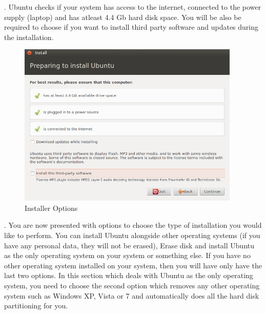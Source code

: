 \par {}. Ubuntu checks if your system has access to the internet, connected to the power supply (laptop) and has atleast 4.4 Gb hard disk space. You will be also be required to choose if you want to install third party software and updates  during the installation. %

\begin{figure}[!h]	
	\begin{center}
	\includegraphics[width=300pt]{./images/installation/installer-prepare.png}
	\caption{Installer Options}	
	\label{fig:installer-prepares}	
	\end{center}
\end{figure}

\par {}. You are now presented with options to choose the type of installation you would like to perform. You can install Ubuntu alongside other operating systems (if you have any personal data, they will not be erased), Erase disk and install Ubuntu as the only operating system on your system or something else. If you have no other operating system installed on your system, then you will have only have the last two options. In this section which deals with Ubuntu as the only operating system, you need to choose the second option which removes any other operating system such as Windows XP, Vista or 7 and automatically does all the hard disk partitioning for you. \\

